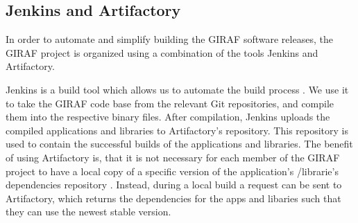 \subsection{Jenkins and Artifactory}
In order to automate and simplify building the GIRAF software releases, the
GIRAF project is organized using a combination of the tools Jenkins and
Artifactory.\nl

Jenkins is a build tool which allows us to automate the build
process \citep{Jenkins}. We use it to take the GIRAF code base from the
relevant Git repositories, and compile them into the respective binary files.
After compilation, Jenkins uploads the compiled applications and libraries to
Artifactory's repository. This repository is used to contain the successful
builds of the applications and libraries. The benefit of using Artifactory is,
that it is not necessary for each member of the GIRAF project to have a local
copy of a specific version of the application's /librarie's dependencies
repository \citep{Arti}. Instead, during a local build a request can be sent to
Artifactory, which returns the dependencies for the apps and libaries such that they can use
the newest stable version.

